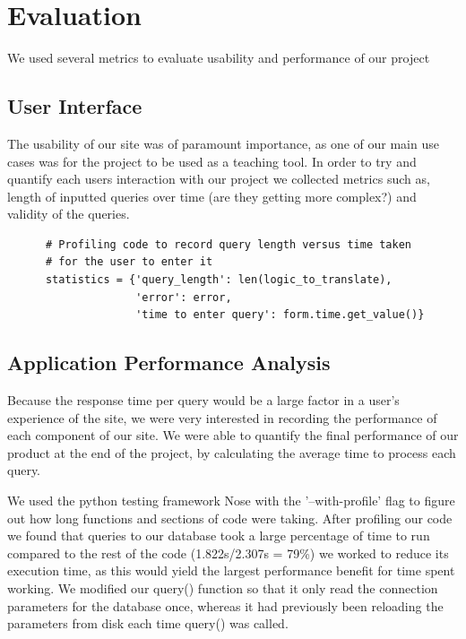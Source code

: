 \documentclass[a4paper, 11pt]{article}
\begin{document}
\section{Evaluation}

    We used several metrics to evaluate usability and performance of our project
    \subsection{User Interface}
    The usability of our site was of paramount importance, as one of our main
    use cases was for the project to be used as a teaching tool. In order to try
    and quantify each users interaction with our project we collected metrics
    such as, length of inputted queries over time (are they getting more
    complex?) and validity of the queries.

    \begin{verbatim}
      # Profiling code to record query length versus time taken
      # for the user to enter it
      statistics = {'query_length': len(logic_to_translate),
                    'error': error,
                    'time to enter query': form.time.get_value()}

    \end{verbatim}
    
    \subsection{Application Performance Analysis}

    Because the response time per query would be a large factor in a user's
    experience of the site, we were very interested in recording the performance
    of each component of our site. We were able to quantify the final
    performance of our product at the end of the project, by calculating the
    average time to process each query.

    We used the python testing framework Nose with the '--with-profile' flag to
    figure out how long functions and sections of code were taking. 
    After profiling our code we found that queries to our database took a large
    percentage of time to run compared to the rest of the code (1.822s/2.307s =
    79\%) we worked to reduce its execution time, as this would yield the largest
    performance benefit for time spent working. 
    We modified our query() function so that it only read the connection 
    parameters for the database once, whereas it had previously been reloading 
    the  parameters from disk each time query() was called.  
\end{document}
